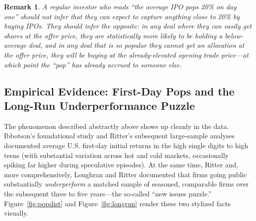 \documentclass[conference]{IEEEtran}
\newtheorem{remark}{Remark}
\begin{document}
\begin{remark}
A regular investor who reads ``the average IPO pops 20\% on day one'' should not infer that they can expect to capture anything close to 20\% by buying IPOs. They should infer the opposite: in any deal where they can easily get shares at the offer price, they are statistically more likely to be holding a below-average deal, and in any deal that is so popular they cannot get an allocation at the offer price, they will be buying at the already-elevated opening trade price---at which point the ``pop'' has already accrued to someone else.
\end{remark}

\subsection{Empirical Evidence: First-Day Pops and the Long-Run Underperformance Puzzle}

The phenomenon described abstractly above shows up cleanly in the data. Ibbotson's foundational study \cite{ibbotson1975} and Ritter's subsequent large-sample analyses \cite{ritter1991} documented average U.S. first-day initial returns in the high single digits to high teens (with substantial variation across hot and cold markets, occasionally spiking far higher during speculative episodes). At the same time, Ritter \cite{ritter1991} and, more comprehensively, Loughran and Ritter \cite{loughranritter1995} documented that firms going public substantially \emph{underperform} a matched sample of seasoned, comparable firms over the subsequent three to five years---the so-called ``new issues puzzle.'' Figure~\ref{fig:popdist} and Figure~\ref{fig:longrun} render these two stylized facts visually.
\end{document}
